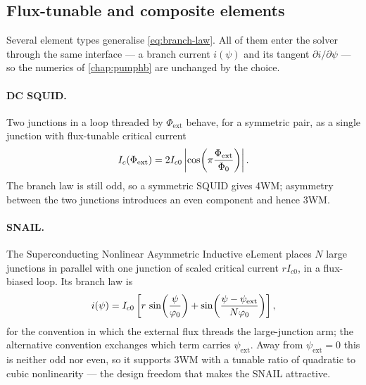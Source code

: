 \subsection{Flux-tunable and composite elements}
\label{sec:composite-elements}

Several element types generalise \eqref{eq:branch-law}. All of them enter the
solver through the same interface --- a branch current $i(\psi)$ and its
tangent $\partial i/\partial\psi$ --- so the numerics of
\cref{chap:pumphb} are unchanged by the choice.

\paragraph{DC SQUID.} Two junctions in a loop threaded by $\Phi_{\mathrm{ext}}$
behave, for a symmetric pair, as a single junction with flux-tunable critical
current
\begin{equation}
  I_c(\Phi_{\mathrm{ext}}) = 2I_{c0}
  \left|\cos\!\left(\pi\frac{\Phi_{\mathrm{ext}}}{\Phi_{0}}\right)\right|.
\end{equation}
The branch law is still odd, so a symmetric SQUID gives 4WM; asymmetry between
the two junctions introduces an even component and hence 3WM.

\paragraph{SNAIL.} The Superconducting Nonlinear Asymmetric Inductive eLement
places $N$ large junctions in parallel with one junction of scaled critical
current $r I_{c0}$, in a flux-biased loop. Its branch law is
\begin{equation}
  i(\psi) = I_{c0}\left[
    r\,\sin\!\left(\frac{\psi}{\varphi_{0}}\right)
    + \sin\!\left(\frac{\psi - \psi_{\mathrm{ext}}}{N\varphi_{0}}\right)
  \right],
  \label{eq:snail-law}
\end{equation}
for the convention in which the external flux threads the large-junction arm;
the alternative convention exchanges which term carries $\psi_{\mathrm{ext}}$.
Away from $\psi_{\mathrm{ext}}=0$ this is neither odd nor even, so it supports
3WM with a tunable ratio of quadratic to cubic nonlinearity --- the design
freedom that makes the SNAIL attractive.

